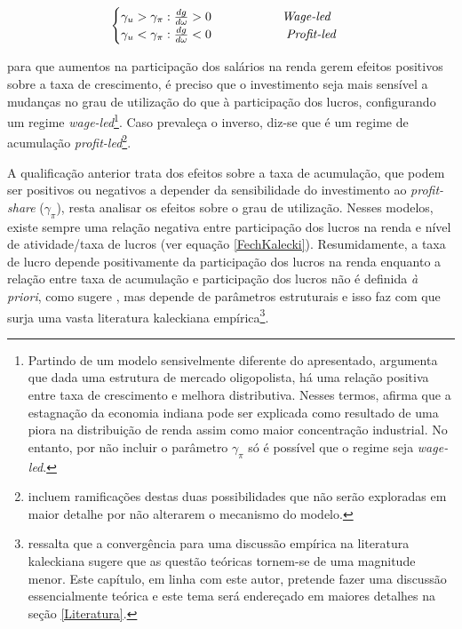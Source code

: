 \begin{center}
$$
\begin{cases}
\gamma_u > \gamma_{\pi}:\frac{dg}{d\omega} > 0\hspace{2cm} \text{\textit{Wage-led}}\\
\gamma_u < \gamma_{\pi}:\frac{dg}{d\omega} < 0 \hspace{2cm} \text{          \textit{Profit-led}}
\end{cases}
$$
\end{center}
para que aumentos na participação dos salários na renda gerem efeitos positivos sobre a taxa de crescimento, é preciso que o investimento seja mais sensível a mudanças no grau de utilização do que à participação dos lucros, configurando um regime \textit{wage-led}\footnote{
Partindo de um modelo sensivelmente diferente do apresentado, \textcite{dutt_stagnation_1984} argumenta que dada uma estrutura de mercado oligopolista, há uma relação positiva entre taxa de crescimento e melhora distributiva. Nesses termos, afirma que a estagnação da economia indiana pode ser explicada como resultado de uma piora na distribuição de renda assim como maior concentração industrial. No entanto, por não incluir o parâmetro $\gamma_\pi$ só é possível que o regime seja \textit{wage-led}.}.  Caso prevaleça o inverso, diz-se que é um regime de acumulação \textit{profit-led}\footnote{\textcite{bhaduri_unemployment_1990} incluem ramificações destas duas possibilidades que não serão exploradas em maior detalhe por não alterarem o mecanismo do modelo.}.

A qualificação anterior trata dos efeitos sobre a taxa de acumulação, que podem ser positivos ou negativos a depender da sensibilidade do investimento ao \textit{profit-share} ($\gamma_{\pi}$), resta analisar os efeitos sobre o grau de utilização. Nesses modelos, existe sempre uma relação negativa entre participação dos lucros na renda e nível de atividade/taxa de lucros (ver equação \ref{FechKalecki}). Resumidamente, a taxa de lucro depende positivamente da participação dos lucros na renda enquanto a relação entre taxa de acumulação e participação dos lucros não é definida \textit{à priori}, como sugere \textcite{bhaduri_unemployment_1990}, mas depende de parâmetros estruturais e isso faz com que surja uma vasta literatura kaleckiana empírica\footnote{\textcite{pariboni_autonomous_2015} ressalta que a convergência para uma discussão empírica na literatura kaleckiana sugere que as questão teóricas tornem-se de uma magnitude menor. Este capítulo, em linha com este autor, pretende fazer uma discussão essencialmente teórica e este tema será endereçado em maiores detalhes na seção \ref{Literatura}.}.

